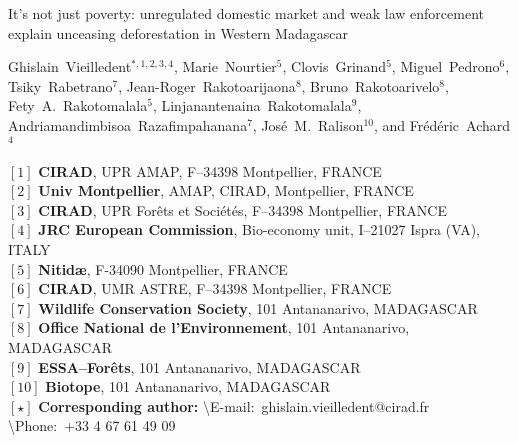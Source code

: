 \begin{center}
  \LARGE{It's not just poverty: unregulated domestic market and weak law enforcement explain unceasing deforestation in Western Madagascar}
\end{center}

\vspace{1cm}

\begin{center}
  \large{Ghislain~Vieilledent$^{*,1,2,3,4}$, Marie~Nourtier$^5$, Clovis~Grinand$^5$, Miguel~Pedrono$^6$,     Tsiky~Rabetrano$^7$, Jean-Roger~Rakotoarijaona$^8$, Bruno~Rakotoarivelo$^8$, Fety~A.~Rakotomalala$^5$, 
  Linjanantenaina~Rakotomalala$^9$, Andriamandimbisoa~Razafimpahanana$^7$, 
  José~M.~Ralison$^{10}$, and Frédéric~Achard$^4$}
\end{center}

\vspace{1cm}

{\small
  \begin{flushleft}
    $[1]$ \textbf{CIRAD}, UPR AMAP, F--34398 Montpellier, FRANCE\\ 
    $[2]$ \textbf{Univ Montpellier}, AMAP, CIRAD, Montpellier, FRANCE\\
    $[3]$ \textbf{CIRAD}, UPR Forêts et Sociétés, F--34398 Montpellier, FRANCE\\
    $[4]$ \textbf{JRC European Commission}, Bio-economy unit, I--21027 Ispra (VA), ITALY\\
    $[5]$ \textbf{Nitid\ae}, F-34090 Montpellier, FRANCE\\
    $[6]$ \textbf{CIRAD}, UMR ASTRE, F--34398 Montpellier, FRANCE\\
    $[7]$ \textbf{Wildlife Conservation Society}, 101 Antananarivo, MADAGASCAR\\
    $[8]$ \textbf{Office National de l'Environnement}, 101 Antananarivo, MADAGASCAR\\
    $[9]$ \textbf{ESSA--Forêts}, 101 Antananarivo, MADAGASCAR\\
    $[10]$ \textbf{Biotope}, 101 Antananarivo, MADAGASCAR
    ~\\
    $[\star]$ \textbf{Corresponding author:}
    \textbackslash{E-mail}:~ghislain.vieilledent@cirad.fr
    \textbackslash{Phone}:~+33 4 67 61 49 09\\
  \end{flushleft}}
\newpage
